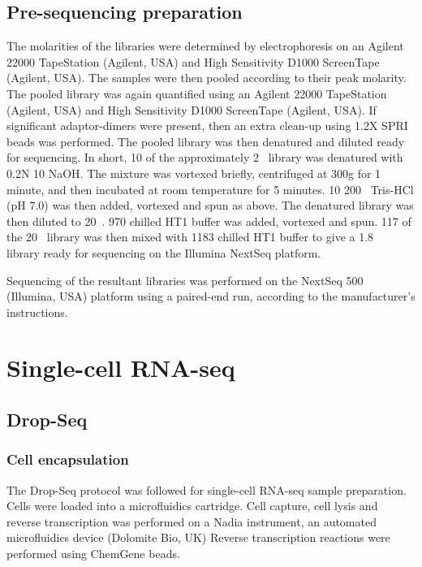 \subsection{Pre-sequencing preparation}\label{subsec:preseq}
The molarities of the libraries were determined by electrophoresis on an Agilent 22000 TapeStation (Agilent, USA) and High Sensitivity D1000 ScreenTape (Agilent, USA).
The samples were then pooled according to their peak molarity.
The pooled library was again quantified using an Agilent 22000 TapeStation (Agilent, USA) and High Sensitivity D1000 ScreenTape (Agilent, USA).
If significant adaptor-dimers were present, then an extra clean-up using 1.2X SPRI beads was performed.
The pooled library was then denatured and diluted ready for sequencing.
In short, 10\ul{} of the approximately 2\si{\nano\Molar} library was denatured with 0.2N 10\ul{} NaOH.
The mixture was vortexed briefly, centrifuged at 300g for 1 minute, and then incubated at room temperature for 5 minutes.
10\ul{} 200\si{\milli\Molar} Tris-HCl (pH 7.0) was then added, vortexed and spun as above.
The denatured library was then diluted to 20\si{\pico\Molar}.
970\ul{} chilled HT1 buffer was added, vortexed and spun.
117\ul{} of the 20\si{\pico\Molar} library was then mixed with 1183\ul{} chilled HT1 buffer to give a 1.8\si{\pico\Molar} library ready for sequencing on the Illumina NextSeq platform.

Sequencing of the resultant libraries was performed on the NextSeq 500 (Illumina, USA) platform using a paired-end run, according to the manufacturer's instructions.

\section{Single-cell RNA-seq}
\subsection{Drop-Seq}

\subsubsection{Cell encapsulation}
The Drop-Seq protocol\cite{macosko2015highly} was followed for single-cell RNA-seq sample preparation.
Cells were loaded into a microfluidics cartridge.
Cell capture, cell lysis and reverse transcription was performed on a Nadia instrument, an automated microfluidics device (Dolomite Bio, UK)
Reverse transcription reactions were performed using ChemGene beads.


